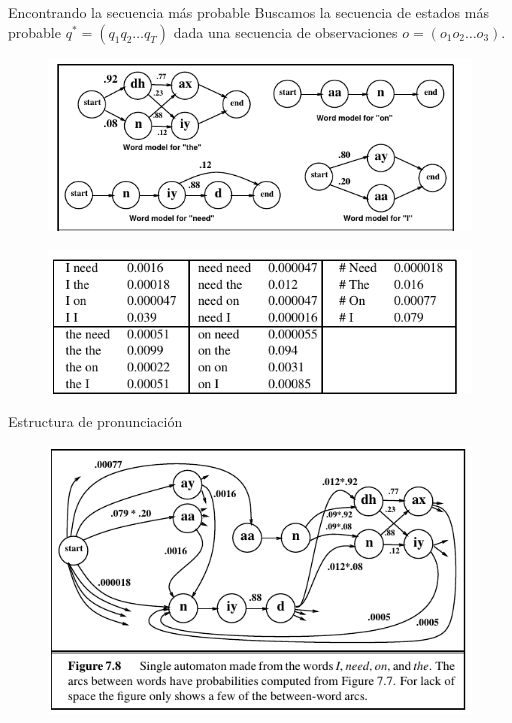 \documentclass[11pt,xcolor={dvipsnames}]{beamer}
\begin{document}
\begin{frame}{Encontrando la secuencia más probable}
Buscamos la secuencia de estados más probable $q^* = (q_1q_2\ldots q_T)$ dada una secuencia de observaciones $o=(o_1o_2\ldots o_3)$.

\begin{figure}
\includegraphics[height=0.35\textheight]{automaton.png}
\end{figure}
\begin{figure}
\includegraphics[height=0.2\textheight]{probabilidad_bigramas.png}
\end{figure}
\end{frame}

\begin{frame}{Estructura de pronunciación}
\begin{figure}
\includegraphics[width=0.8\linewidth]{joined_words.png}
\end{figure}
\end{frame}
\end{document}
